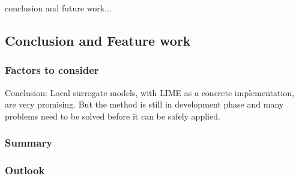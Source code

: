 conclusion and future work...

\subsection{Conclusion and Feature work}


\subsubsection{Factors to consider}
Conclusion: Local surrogate models, with LIME as a concrete implementation, are very promising. But the method is still in development phase and many problems need to be solved before it can be safely applied.

\subsubsection{Summary}

\subsubsection{Outlook}
